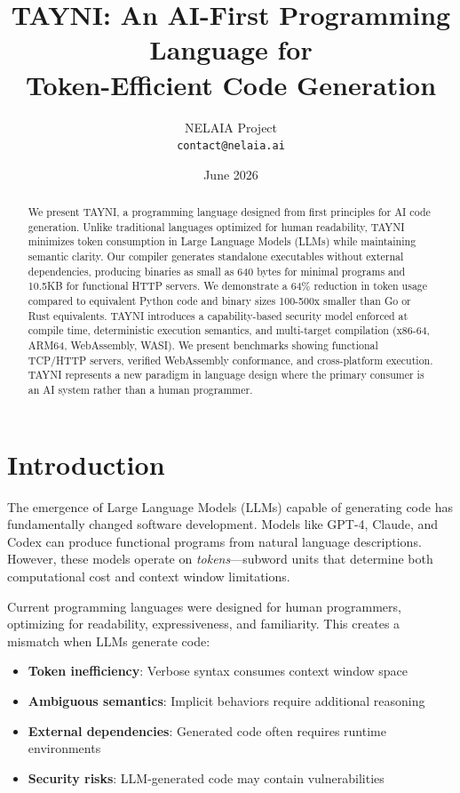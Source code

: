 \documentclass[11pt,a4paper]{article}
\title{TAYNI: An AI-First Programming Language for\\Token-Efficient Code Generation}
\author{
    NELAIA Project\\
    \texttt{contact@nelaia.ai}
}
\date{June 2026}
\begin{document}
\maketitle

\begin{abstract}
We present TAYNI, a programming language designed from first principles for AI code generation. Unlike traditional languages optimized for human readability, TAYNI minimizes token consumption in Large Language Models (LLMs) while maintaining semantic clarity. Our compiler generates standalone executables without external dependencies, producing binaries as small as 640 bytes for minimal programs and 10.5KB for functional HTTP servers. We demonstrate a 64\% reduction in token usage compared to equivalent Python code and binary sizes 100-500x smaller than Go or Rust equivalents. TAYNI introduces a capability-based security model enforced at compile time, deterministic execution semantics, and multi-target compilation (x86-64, ARM64, WebAssembly, WASI). We present benchmarks showing functional TCP/HTTP servers, verified WebAssembly conformance, and cross-platform execution. TAYNI represents a new paradigm in language design where the primary consumer is an AI system rather than a human programmer.
\end{abstract}

\section{Introduction}

The emergence of Large Language Models (LLMs) capable of generating code has fundamentally changed software development. Models like GPT-4, Claude, and Codex can produce functional programs from natural language descriptions. However, these models operate on \textit{tokens}—subword units that determine both computational cost and context window limitations.

Current programming languages were designed for human programmers, optimizing for readability, expressiveness, and familiarity. This creates a mismatch when LLMs generate code:

\begin{itemize}
    \item \textbf{Token inefficiency}: Verbose syntax consumes context window space
    \item \textbf{Ambiguous semantics}: Implicit behaviors require additional reasoning
    \item \textbf{External dependencies}: Generated code often requires runtime environments
    \item \textbf{Security risks}: LLM-generated code may contain vulnerabilities
\end{itemize}
\end{document}
